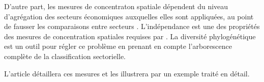 \documentclass[a4paper]{article}
\begin{document}
D'autre part, les mesures de concentraton spatiale dépendent du niveau d'agrégation des secteurs économiques auxquelles elles sont appliquées, au point de fausser les comparaisons entre secteurs \citep{Bickenbach2013}. 
L'indépendance est une des propriétés des mesures de concentration spatiales requises par \cite{Combes2004}.
La diversité phylogénétique est un outil pour régler ce problème en  prenant en compte l'arborescence complète de la classification sectorielle.

L'article détaillera ces mesures et les illustrera par un exemple traité en détail.




\end{document}
